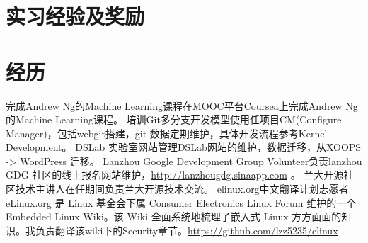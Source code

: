 \documentclass[11pt,a4paper]{moderncv}
\begin{document}
\section{实习经验及奖励}

\section{经历} %
{完成Andrew Ng的Machine Learning课程}{}{}{}{在MOOC平台Coursea上完成Andrew Ng的Machine Learning课程。}
{培训Git多分支开发模型使用}{}{}{}{任项目CM(Configure Manager)，包括webgit搭建，git 数据定期维护，具体开发流程参考Kernel Development。}
{DSLab 实验室网站管理}{}{}{}{DSLab网站的维护，数据迁移，从XOOPS -> WordPress 迁移。}
{Lanzhou Google Development Group Volunteer}{}{}{}{负责lanzhou GDG 社区的线上报名网站维护，\url{http://lanzhougdg.sinaapp.com} 。}
{兰大开源社区技术主讲人}{}{}{}{在任期间负责兰大开源技术交流。}
{elinux.org中文翻译计划志愿者}{}{}{}{eLinux.org 是 Linux 基金会下属 Consumer Electronics 
Linux Forum 维护的一个 Embedded Linux Wiki。该 Wiki 全面系统地梳理了嵌入式 Linux 方方面面的知识。我负责翻译该wiki下的Security章节。\url{https://github.com/lzz5235/elinux}}

\closesection{}                   %
\renewcommand{\listitemsymbol}{-} %

\nocite{*}


\end{document}
